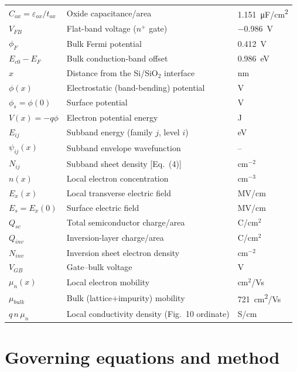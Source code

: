 \documentclass[11pt]{article}
\begin{document}
\begin{longtable}{@{}l l l@{}}
$C_{ox}=\varepsilon_{ox}/t_{ox}$ & Oxide capacitance/area          & \SI{1.151}{\micro F/cm^2}\\
$V_{FB}$       & Flat-band voltage ($n^+$ gate)                 & \SI{-0.986}{V}\\
$\phi_F$       & Bulk Fermi potential                           & \SI{0.412}{V}\\
$E_{c0}{-}E_F$ & Bulk conduction-band offset                    & \SI{0.986}{eV}\\
$x$            & Distance from the Si/SiO$_2$ interface         & nm\\
$\phi(x)$      & Electrostatic (band-bending) potential         & V\\
$\phi_s=\phi(0)$ & Surface potential                            & V\\
$V(x)=-q\phi$  & Electron potential energy                      & J\\
$E_{ij}$       & Subband energy (family $j$, level $i$)         & eV\\
$\psi_{ij}(x)$ & Subband envelope wavefunction                  & --\\
$N_{ij}$       & Subband sheet density [Eq.~(4)]                & cm$^{-2}$\\
$n(x)$         & Local electron concentration                   & cm$^{-3}$\\
$E_x(x)$       & Local transverse electric field                & MV/cm\\
$E_s=E_x(0)$   & Surface electric field                         & MV/cm\\
$Q_{sc}$       & Total semiconductor charge/area                & C/cm$^2$\\
$Q_{inv}$      & Inversion-layer charge/area                    & C/cm$^2$\\
$N_{inv}$      & Inversion sheet electron density               & cm$^{-2}$\\
$V_{GB}$       & Gate--bulk voltage                             & V\\
$\mu_n(x)$     & Local electron mobility                        & cm$^2$/Vs\\
$\mu_{bulk}$   & Bulk (lattice+impurity) mobility               & \SI{721}{cm^2/Vs}\\
$q\,n\,\mu_n$  & Local conductivity density (Fig.~10 ordinate)  & S/cm\\
\bottomrule
\end{longtable}

\newpage
\section{Governing equations and method}
\end{document}
